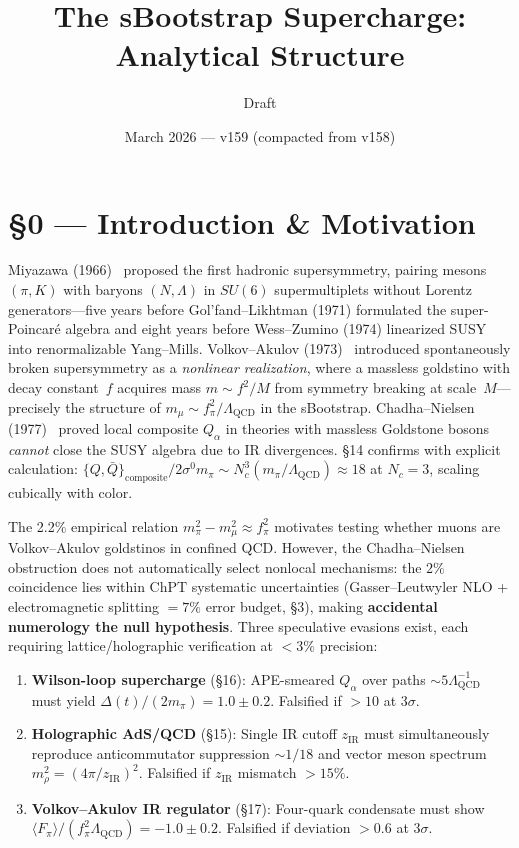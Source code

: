 \documentclass[11pt,a4paper]{article}
\title{The sBootstrap Supercharge: Analytical Structure}
\author{Draft}
\date{March 2026 --- v159 (compacted from v158)}
\newcommand{\Lqcd}{\Lambda_{\text{QCD}}}
\newcommand{\fpi}{f_\pi}
\newcommand{\mpi}{m_\pi}
\newcommand{\mmu}{m_\mu}
\newcommand{\Nc}{N_c}
\begin{document}
\maketitle

\section*{\S 0 --- Introduction \& Motivation}

Miyazawa (1966)~\cite{Miyazawa:1966} proposed the first hadronic supersymmetry, pairing mesons $(\pi, K)$ with baryons $(N, \Lambda)$ in $SU(6)$ supermultiplets without Lorentz generators---five years before Gol'fand--Likhtman (1971) formulated the super-Poincar\'e algebra and eight years before Wess--Zumino (1974) linearized SUSY into renormalizable Yang--Mills.  Volkov--Akulov (1973)~\cite{VolkovAkulov:1973} introduced spontaneously broken supersymmetry as a \emph{nonlinear realization}, where a massless goldstino with decay constant~$f$ acquires mass $m \sim f^2/M$ from symmetry breaking at scale~$M$---precisely the structure of $\mmu \sim \fpi^2/\Lqcd$ in the sBootstrap.  Chadha--Nielsen (1977)~\cite{ChadhaNielsen:1977} proved local composite $Q_\alpha$ in theories with massless Goldstone bosons \emph{cannot} close the SUSY algebra due to IR divergences.  \S 14 confirms with explicit calculation: $\{Q,\bar{Q}\}_{\text{composite}}/2\sigma^0 \mpi \sim \Nc^3(\mpi/\Lqcd) \approx 18$ at $\Nc=3$, scaling cubically with color.

The 2.2\% empirical relation $\mpi^2 - \mmu^2 \approx \fpi^2$ motivates testing whether muons are Volkov--Akulov goldstinos in confined QCD.  However, the Chadha--Nielsen obstruction does not automatically select nonlocal mechanisms: the $2\%$ coincidence lies within ChPT systematic uncertainties (Gasser--Leutwyler NLO + electromagnetic splitting $= 7\%$ error budget, \S 3), making \textbf{accidental numerology the null hypothesis}.  Three speculative evasions exist, each requiring lattice/holographic verification at ${<}3\%$ precision:
\begin{enumerate}\item \textbf{Wilson-loop supercharge} (\S 16): APE-smeared $Q_\alpha$ over paths $\sim 5\Lqcd^{-1}$ must yield $\Delta(t)/(2\mpi)=1.0\pm 0.2$.  Falsified if ${>}10$ at $3\sigma$.
\item \textbf{Holographic AdS/QCD} (\S 15): Single IR cutoff $z_{\text{IR}}$ must simultaneously reproduce anticommutator suppression $\sim 1/18$ and vector meson spectrum $m_\rho^2=(4\pi/z_{\text{IR}})^2$.  Falsified if $z_{\text{IR}}$ mismatch ${>}15\%$.
\item \textbf{Volkov--Akulov IR regulator} (\S 17): Four-quark condensate must show $\langle F_\pi\rangle/(\fpi^2\Lqcd)=-1.0\pm 0.2$.  Falsified if deviation ${>}0.6$ at $3\sigma$.
\end{enumerate}
\end{document}
